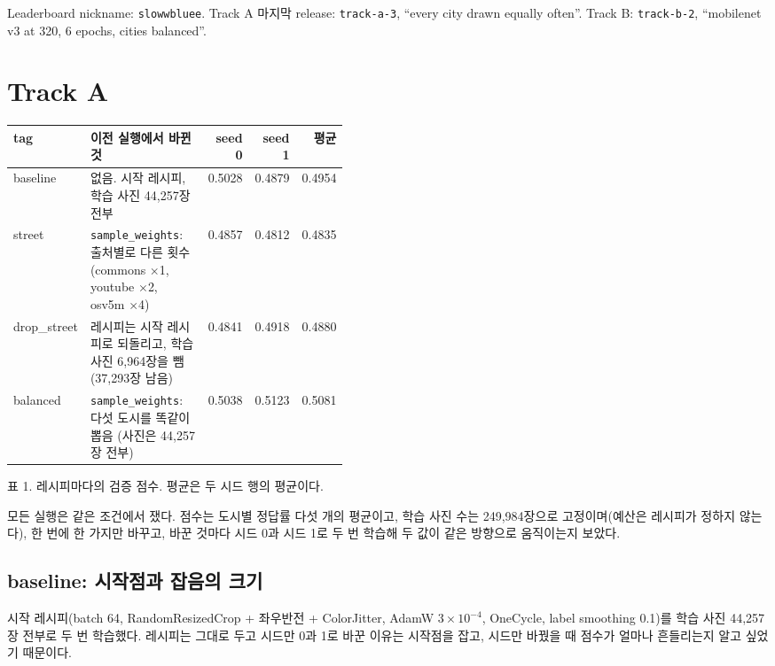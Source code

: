 \documentclass[11pt]{article}
\begin{document}
\makeheader

Leaderboard nickname: \texttt{slowwbluee}. Track A 마지막 release: \texttt{track-a-3},
``every city drawn equally often''. Track B: \texttt{track-b-2},
``mobilenet v3 at 320, 6 epochs, cities balanced''.


\section*{Track A}

\begin{center}\footnotesize
\begin{tabular}{lp{0.44\linewidth}rrr}
\toprule
tag & 이전 실행에서 바뀐 것 & seed 0 & seed 1 & 평균 \\
\midrule
baseline & 없음. 시작 레시피, 학습 사진 44,257장 전부 & 0.5028 & 0.4879 & 0.4954 \\
street & \texttt{sample\_weights}: 출처별로 다른 횟수 (commons $\times$1, youtube $\times$2, osv5m $\times$4) & 0.4857 & 0.4812 & 0.4835 \\
drop\_street & 레시피는 시작 레시피로 되돌리고, 학습 사진 6,964장을 뺌 (37,293장 남음) & 0.4841 & 0.4918 & 0.4880 \\
balanced & \texttt{sample\_weights}: 다섯 도시를 똑같이 뽑음 (사진은 44,257장 전부) & 0.5038 & 0.5123 & 0.5081 \\
\bottomrule
\end{tabular}

{\footnotesize 표 1. 레시피마다의 검증 점수. 평균은 두 시드 행의 평균이다.}
\end{center}

모든 실행은 같은 조건에서 쟀다. 점수는 도시별 정답률 다섯 개의 평균이고, 학습 사진
수는 249,984장으로 고정이며(예산은 레시피가 정하지 않는다), 한 번에 한 가지만 바꾸고,
바꾼 것마다 시드 0과 시드 1로 두 번 학습해 두 값이 같은 방향으로 움직이는지 보았다.

\subsection*{baseline: 시작점과 잡음의 크기}

시작 레시피(batch 64, RandomResizedCrop + 좌우반전 + ColorJitter, AdamW
$3\times10^{-4}$, OneCycle, label smoothing 0.1)를 학습 사진 44,257장 전부로 두 번
학습했다. 레시피는 그대로 두고 시드만 0과 1로 바꾼 이유는 시작점을 잡고, 시드만
바꿨을 때 점수가 얼마나 흔들리는지 알고 싶었기 때문이다.
\end{document}
